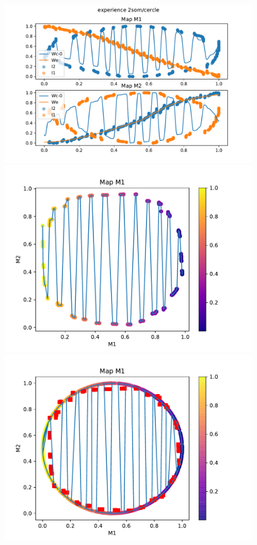 \begin{figure}[h!]
\begin{minipage}{0.33\textwidth}
\includegraphics[width=\textwidth]{2som_cercle_w.pdf}
\end{minipage}
\begin{minipage}{0.33\textwidth}
\includegraphics[width=\textwidth]{2som_cercle_d.pdf}
\end{minipage}
\begin{minipage}{0.33\textwidth}
\includegraphics[width=\textwidth]{2som_cercle_din.pdf}

\end{minipage}
\end{figure}
